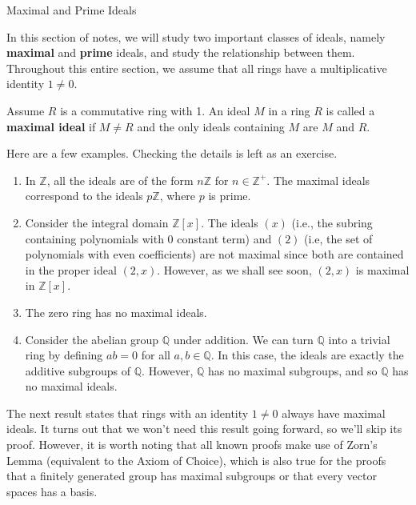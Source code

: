 \begin{section}{Maximal and Prime Ideals}

In this section of notes, we will study two important classes of ideals, namely \textbf{maximal} and \textbf{prime} ideals, and study the relationship between them. Throughout this entire section, we assume that all rings have a multiplicative identity $1\neq 0$. 

\begin{definition}
Assume $R$ is a commutative ring with 1. An ideal $M$ in a ring $R$ is called a \textbf{maximal ideal} if $M\neq R$ and the only ideals containing $M$ are $M$ and $R$.
\end{definition}

\begin{example}
Here are a few examples.  Checking the details is left as an exercise.
\begin{enumerate}[label=\rm{(\alph*)}]
\item In $\mathbb{Z}$, all the ideals are of the form $n\mathbb{Z}$ for $n\in\mathbb{Z}^+$.  The maximal ideals correspond to the ideals $p\mathbb{Z}$, where $p$ is prime.
\item Consider the integral domain $\mathbb{Z}[x]$.  The ideals $(x)$ (i.e., the subring containing polynomials with 0 constant term) and $(2)$ (i.e, the set of polynomials with even coefficients) are not maximal since both are contained in the proper ideal $(2,x)$.  However, as we shall see soon, $(2,x)$ is maximal in $\mathbb{Z}[x]$.
\item The zero ring has no maximal ideals.
\item Consider the abelian group $\mathbb{Q}$ under addition.  We can turn $\mathbb{Q}$ into a trivial ring by defining $ab=0$ for all $a,b\in\mathbb{Q}$.  In this case, the ideals are exactly the additive subgroups of $\mathbb{Q}$.  However, $\mathbb{Q}$ has no maximal subgroups, and so $\mathbb{Q}$ has no maximal ideals.
\end{enumerate}
\end{example}

The next result states that rings with an identity $1\neq 0$ always have maximal ideals.  It turns out that we won't need this result going forward, so we'll skip its proof.  However, it is worth noting that all known proofs make use of Zorn's Lemma (equivalent to the Axiom of Choice), which is also true for the proofs that a finitely generated group has maximal subgroups or that every vector spaces has a basis.


\end{section}
